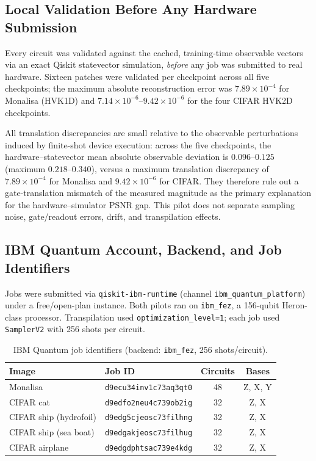 \documentclass[11pt]{article}
\begin{document}
\subsection{Local Validation Before Any Hardware Submission}
Every circuit was validated against the cached, training-time observable vectors via an exact Qiskit statevector simulation, \emph{before} any job was submitted to real hardware. Sixteen patches were validated per checkpoint across all five checkpoints; the maximum absolute reconstruction error was $7.89\times10^{-4}$ for Monalisa (HVK1D) and $7.14\times10^{-6}$--$9.42\times10^{-6}$ for the four CIFAR HVK2D checkpoints.

All translation discrepancies are small relative to the observable perturbations induced by finite-shot device execution: across the five checkpoints, the hardware--statevector mean absolute observable deviation is $0.096$--$0.125$ (maximum $0.218$--$0.340$), versus a maximum translation discrepancy of $7.89\times10^{-4}$ for Monalisa and $9.42\times10^{-6}$ for CIFAR. They therefore rule out a gate-translation mismatch of the measured magnitude as the primary explanation for the hardware--simulator PSNR gap. This pilot does not separate sampling noise, gate/readout errors, drift, and transpilation effects.

\subsection{IBM Quantum Account, Backend, and Job Identifiers}
Jobs were submitted via \texttt{qiskit-ibm-runtime} (channel \texttt{ibm\_quantum\_platform}) under a free/open-plan instance. Both pilots ran on \texttt{ibm\_fez}, a 156-qubit Heron-class processor. Transpilation used \texttt{optimization\_level=1}; each job used \texttt{SamplerV2} with 256 shots per circuit.

\begin{table}[H]
\centering
\caption{IBM Quantum job identifiers (backend: \texttt{ibm\_fez}, 256 shots/circuit).}
\scriptsize
\begin{tabular}{llcc}
\toprule
Image & Job ID & Circuits & Bases \\
\midrule
Monalisa & \texttt{d9ecu34inv1c73aq3qt0} & 48 & Z, X, Y \\
CIFAR cat & \texttt{d9edfo2neu4c739ob2ig} & 32 & Z, X \\
CIFAR ship (hydrofoil) & \texttt{d9edg5cjeosc73filhng} & 32 & Z, X \\
CIFAR ship (sea boat) & \texttt{d9edgakjeosc73filhug} & 32 & Z, X \\
CIFAR airplane & \texttt{d9edgdphtsac739e4kdg} & 32 & Z, X \\
\bottomrule
\end{tabular}
\end{table}
\end{document}
